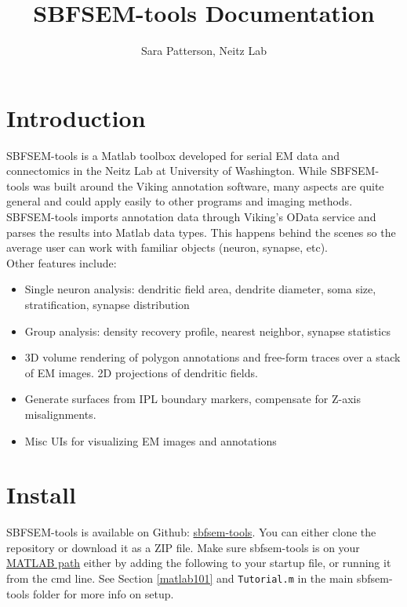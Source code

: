 \documentclass[12pt]{exam}
\title{SBFSEM-tools Documentation}
\author{Sara Patterson, Neitz Lab}
\date{\vspace{-5ex}}
\begin{document}
	\maketitle
	\tableofcontents
	\pagebreak
	\section{Introduction}
	SBFSEM-tools is a Matlab toolbox developed for serial EM data and connectomics in the Neitz Lab at University of Washington. While SBFSEM-tools was built around the Viking annotation software, many aspects are quite general and could apply easily to other programs and imaging methods.\\
	SBFSEM-tools imports annotation data through Viking's OData service and parses the results into Matlab data types. This happens behind the scenes so the average user can work with familiar objects (neuron, synapse, etc).\\
	Other features include:
	\begin{itemize}
		\item Single neuron analysis: dendritic field area, dendrite diameter, soma size, stratification, synapse distribution
		\item Group analysis: density recovery profile, nearest neighbor, synapse statistics
		\item 3D volume rendering of polygon annotations and free-form traces over a stack of EM images. 2D projections of dendritic fields.
		\item Generate surfaces from IPL boundary markers, compensate for Z-axis misalignments.
		\item Misc UIs for visualizing EM images and annotations
	\end{itemize}
	\section{Install}
	SBFSEM-tools is available on Github: \href{http://github.com/sarastokes/sbfsem-tools}{sbfsem-tools}. You can either clone the repository or download it as a ZIP file.
	Make sure sbfsem-tools is on your \href{https://www.mathworks.com/help/matlab/ref/addpath.html}{MATLAB path} either by adding the following to your startup file, or running it from the cmd line.
	See Section \ref{matlab101} and \texttt{Tutorial.m} in the main sbfsem-tools folder for more info on setup.
\end{document}

